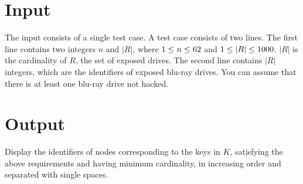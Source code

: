 \section*{Input}
The input consists of a single test case. A test case consists of two
lines.  The first line contains two integers $n$ and $|R|$, where $1
\le n \le 62$ and $1 \le |R| \le 1000$. $|R|$
is the cardinality of $R$, the set of exposed drives. The second
line contains $|R|$ integers, which are the identifiers of exposed
blu-ray drives. You can assume that there is at least one blu-ray
drive not hacked.

\section*{Output}
Display the identifiers of nodes corresponding to the keys in $K$, satisfying the above requirements and having minimum cardinality, in increasing order and separated with single spaces.
